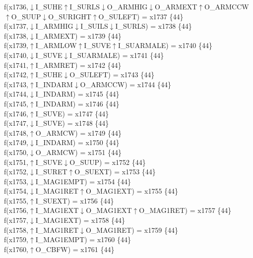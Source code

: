 f(x1736,$\downarrow$I\_SUHE$\uparrow$I\_SURLS$\downarrow$O\_ARMHIG$\downarrow$O\_ARMEXT$\uparrow$O\_ARMCCW$\uparrow$O\_SUUP$\downarrow$O\_SURIGHT$\uparrow$O\_SULEFT) = x1737 \{44\} \\  
f(x1737,$\downarrow$I\_ARMHIG$\downarrow$I\_SUILS$\downarrow$I\_SURLS) = x1738 \{44\} \\  
f(x1738,$\downarrow$I\_ARMEXT) = x1739 \{44\} \\  
f(x1739,$\uparrow$I\_ARMLOW$\uparrow$I\_SUVE$\uparrow$I\_SUARMALE) = x1740 \{44\} \\  
f(x1740,$\downarrow$I\_SUVE$\downarrow$I\_SUARMALE) = x1741 \{44\} \\  
f(x1741,$\uparrow$I\_ARMRET) = x1742 \{44\} \\  
f(x1742,$\uparrow$I\_SUHE$\downarrow$O\_SULEFT) = x1743 \{44\} \\  
f(x1743,$\uparrow$I\_INDARM$\downarrow$O\_ARMCCW) = x1744 \{44\} \\  
f(x1744,$\downarrow$I\_INDARM) = x1745 \{44\} \\  
f(x1745,$\uparrow$I\_INDARM) = x1746 \{44\} \\  
f(x1746,$\uparrow$I\_SUVE) = x1747 \{44\} \\  
f(x1747,$\downarrow$I\_SUVE) = x1748 \{44\} \\  
f(x1748,$\uparrow$O\_ARMCW) = x1749 \{44\} \\  
f(x1749,$\downarrow$I\_INDARM) = x1750 \{44\} \\  
f(x1750,$\downarrow$O\_ARMCW) = x1751 \{44\} \\  
f(x1751,$\uparrow$I\_SUVE$\downarrow$O\_SUUP) = x1752 \{44\} \\  
f(x1752,$\downarrow$I\_SURET$\uparrow$O\_SUEXT) = x1753 \{44\} \\  
f(x1753,$\downarrow$I\_MAG1EMPT) = x1754 \{44\} \\  
f(x1754,$\downarrow$I\_MAG1RET$\uparrow$O\_MAG1EXT) = x1755 \{44\} \\  
f(x1755,$\uparrow$I\_SUEXT) = x1756 \{44\} \\  
f(x1756,$\uparrow$I\_MAG1EXT$\downarrow$O\_MAG1EXT$\uparrow$O\_MAG1RET) = x1757 \{44\} \\  
f(x1757,$\downarrow$I\_MAG1EXT) = x1758 \{44\} \\  
f(x1758,$\uparrow$I\_MAG1RET$\downarrow$O\_MAG1RET) = x1759 \{44\} \\  
f(x1759,$\uparrow$I\_MAG1EMPT) = x1760 \{44\} \\  
f(x1760,$\uparrow$O\_CBFW) = x1761 \{44\} \\  
